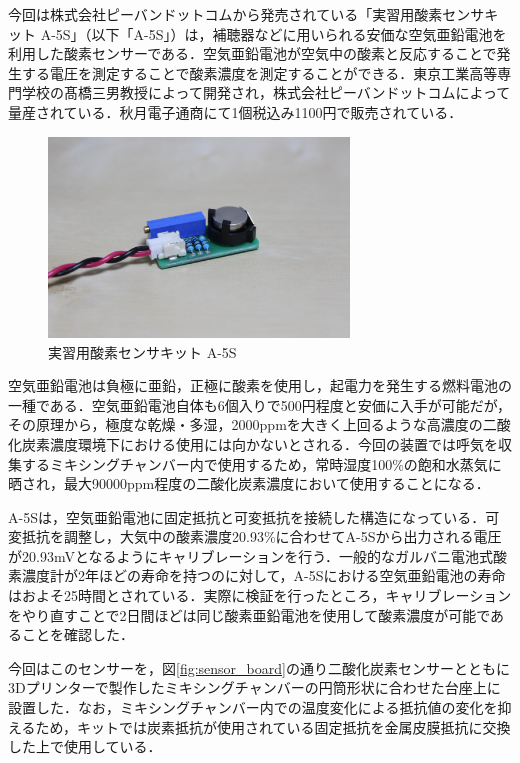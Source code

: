 今回は株式会社ピーバンドットコムから発売されている「実習用酸素センサキット A-5S」（以下「A-5S」）は，補聴器などに用いられる安価な空気亜鉛電池を利用した酸素センサーである．空気亜鉛電池が空気中の酸素と反応することで発生する電圧を測定することで酸素濃度を測定することができる．東京工業高等専門学校の髙橋三男教授によって開発され，株式会社ピーバンドットコムによって量産されている．秋月電子通商にて1個税込み1100円で販売されている．

\begin{figure}[H]
  \begin{center}
    \includegraphics[width=8cm]{fig/a-5s}
    \caption{実習用酸素センサキット A-5S}
    \label{fig:a-5s}
  \end{center}
\end{figure}

空気亜鉛電池は負極に亜鉛，正極に酸素を使用し，起電力を発生する燃料電池の一種である．空気亜鉛電池自体も6個入りで500円程度と安価に入手が可能だが，その原理から，極度な乾燥・多湿，2000ppmを大きく上回るような高濃度の二酸化炭素濃度環境下における使用には向かないとされる．今回の装置では呼気を収集するミキシングチャンバー内で使用するため，常時湿度100\%の飽和水蒸気に晒され，最大90000ppm程度の二酸化炭素濃度において使用することになる．

A-5Sは，空気亜鉛電池に固定抵抗と可変抵抗を接続した構造になっている．可変抵抗を調整し，大気中の酸素濃度20.93\%に合わせてA-5Sから出力される電圧が20.93mVとなるようにキャリブレーションを行う．一般的なガルバニ電池式酸素濃度計が2年ほどの寿命を持つのに対して，A-5Sにおける空気亜鉛電池の寿命はおよそ25時間とされている．実際に検証を行ったところ，キャリブレーションをやり直すことで2日間ほどは同じ酸素亜鉛電池を使用して酸素濃度が可能であることを確認した．

今回はこのセンサーを，図\ref{fig:sensor_board}の通り二酸化炭素センサーとともに3Dプリンターで製作したミキシングチャンバーの円筒形状に合わせた台座上に設置した．なお，ミキシングチャンバー内での温度変化による抵抗値の変化を抑えるため，キットでは炭素抵抗が使用されている固定抵抗を金属皮膜抵抗に交換した上で使用している．

